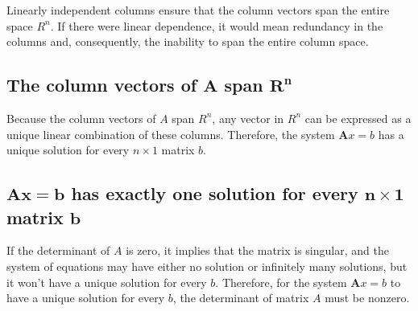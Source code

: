 \documentclass[
  letterpaper,
  DIV=11,
  numbers=noendperiod]{scrartcl}
\begin{document}
Linearly independent columns ensure that the column vectors span the
entire space \(R^n\). If there were linear dependence, it would mean
redundancy in the columns and, consequently, the inability to span the
entire column space.

\hypertarget{the-column-vectors-of-symbfa-span-symbfrn}{%
\subsection{\texorpdfstring{The column vectors of \(\symbf{A}\) span
\(\symbf{R^n}\)}{The column vectors of \textbackslash symbf\{A\} span \textbackslash symbf\{R\^{}n\}}}\label{the-column-vectors-of-symbfa-span-symbfrn}}

Because the column vectors of \(A\) span \(R^n\), any vector in \(R^n\)
can be expressed as a unique linear combination of these columns.
Therefore, the system \(\symbf{A}x = b\) has a unique solution for every
\(n \times 1\) matrix \(b\).

\hypertarget{symbfax-b-has-exactly-one-solution-for-every-symbfn-times-1-matrix-symbfb}{%
\subsection{\texorpdfstring{\(\symbf{Ax = b}\) has exactly one solution
for every \(\symbf{n \times 1}\) matrix
\(\symbf{b}\)}{\textbackslash symbf\{Ax = b\} has exactly one solution for every \textbackslash symbf\{n \textbackslash times 1\} matrix \textbackslash symbf\{b\}}}\label{symbfax-b-has-exactly-one-solution-for-every-symbfn-times-1-matrix-symbfb}}

If the determinant of \(A\) is zero, it implies that the matrix is
singular, and the system of equations may have either no solution or
infinitely many solutions, but it won't have a unique solution for every
\(b\). Therefore, for the system \(\symbf{A}x = b\) to have a unique
solution for every \(b\), the determinant of matrix \(A\) must be
nonzero.
\end{document}
